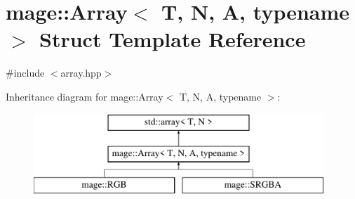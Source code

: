 \hypertarget{structmage_1_1_array}{}\section{mage\+:\+:Array$<$ T, N, A, typename $>$ Struct Template Reference}
\label{structmage_1_1_array}


{\ttfamily \#include $<$array.\+hpp$>$}

Inheritance diagram for mage\+:\+:Array$<$ T, N, A, typename $>$\+:\begin{figure}[H]
\begin{center}
\leavevmode
\includegraphics[height=3.000000cm]{structmage_1_1_array}
\end{center}
\end{figure}
